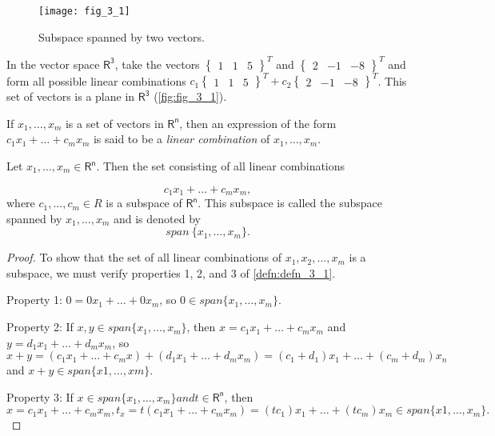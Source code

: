 \documentclass[../main.tex]{subfiles}
\begin{document}
\begin{figure}
	\centering
	\texttt{[image: fig\_3\_1]}
	\caption{Subspace spanned by two vectors.}
	\label{fig:fig_3_1}
\end{figure}

In the vector space $\mathsf{R^3}$, take the vectors $\begin{Bmatrix} 1 & 1 & 5 \end{Bmatrix}^{T}$ and $\begin{Bmatrix} 2 & -1 & -8 \end{Bmatrix}^{T}$
and form all possible linear combinations
$c_{1}\begin{Bmatrix} 1 & 1 & 5 \end{Bmatrix}^{T} + c_{2} \begin{Bmatrix} 2 & -1 & -8 \end{Bmatrix}^{T}$. This set of vectors is a plane in $\mathsf{R^3}$ (\autoref{fig:fig_3_1}).

\begin{definition}
	\label{defn:defn_3_2}
	If $x_1, \ldots, x_m$ is a set of vectors in $\mathsf{R^n}$, then an expression of the form $c_1 x_1 + \ldots + c_m x_m$ is said to be a \emph{linear combination} of $x_1, \ldots ,x_m$.
\end{definition}

\begin{theorem}
	\label{theo:theo_3_1}
	Let $x_1, \ldots ,x_m \in \mathsf{R^n}$. Then the set consisting of all linear combinations

	$$c_1 x_1 + \ldots + c_m x_m,$$
	where $c_1, \ldots, c_m \in  R$ is a subspace of $\mathsf{R^n}$. This subspace is called the subspace spanned by $x_1,\ldots  ,x_m$ and is denoted by
	$$span~\{x_1, \ldots ,x_m\}.$$
\end{theorem}

\begin{proof}
	To show that the set of all linear combinations of $x_1, x_2,\ldots , x_m$ is a subspace, we must verify properties 1, 2, and 3 of  \autoref{defn:defn_3_1}.

	Property 1: $0 = 0 x_1 + \ldots +0 x_m$, so $0 \in span \{x_1, \ldots , x_m\}.$

	Property 2: If $x, y \in span \{x_1, \ldots ,x_m\}$, then $x = c_1 x_1 + \ldots + c_m x_m$ and $y = d_1 x_1 +\ldots + d_m x_m$, so
	$$x + y = (c_1 x_1 + \ldots + c_m x) + (d_1 x_1 + \ldots + d_m x_m)
	= (c_1 + d_1)x_1 + \ldots + (c_m + d_m) x_n$$
	and $x + y \in span \{x1, ... ,xm\}.$

	Property 3: If $x \in span \{x_1, \ldots  ,x_m\} and t \in \mathsf{R^n}$, then $x = c_1 x_1 + \ldots + c_m x_m, t_x = t(c_1 x_1 +\ldots + c_m x_m) = (tc_1) x_1 +\ldots + (tc_m) x_m \in span \{x1, \ldots  ,x_m\}.$
\end{proof}
\end{document}
